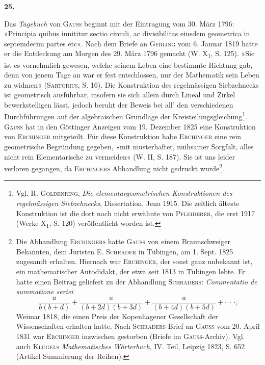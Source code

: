 \clearpage\begingroup{}
\renewcommand{\thefootnote}{\arabic{footnote})}\setcounter{footnote}{2}
\begin{center}
\textbf{25.}\par\smallskip
{}
\end{center}
\noindent\hspace*{\parindent}Das \textit{Tagebuch} von \textsc{Gauss} beginnt mit der Eintragung vom 30. März 1796:
»Principia quibus innititur sectio circuli, ac divisibilitas eiusdem geometrica
in septemdecim partes etc«. Nach dem Briefe an \textsc{Gerling} vom 6. Januar 1819
hatte er die Entdeckung am Morgen des 29. März 1796 gemacht (W. X\textsubscript{1},
S. 125). »Sie ist es vornehmlich gewesen, welche seinem Leben eine bestimmte
Richtung gab, denn von jenem Tage an war er fest entschlossen,
nur der Mathematik sein Leben zu widmen« (\textsc{Sartorius}, S. 16). Die Konstruktion
des regelmässigen Siebzehnecks ist geometrisch ausführbar, insofern
sie sich allein durch Lineal und Zirkel bewerkstelligen lässt, jedoch beruht
der Beweis bei all’ den verschiedenen Durchführungen auf der algebraischen
Grundlage der Kreisteilungsgleichung\footnote{Vgl. R. \textsc{Goldenring}, \textit{Die elementargeometrischen Konstruktionen des regelmässigen Siebzehnecks}, Dissertation, Jena 1915. Die zeitlich älteste Konstruktion ist die dort noch nicht erwähnte von \textsc{Pfleiderer}, die erst 1917 (Werke X\textsubscript{1}, S. 120) veröffentlicht worden ist.}. \textsc{Gauss} hat in den Göttinger Anzeigen
vom 19. Dezember 1825 eine Konstruktion von \textsc{Erchinger} mitgeteilt. Für
diese Konstruktion habe \textsc{Erchinger} eine rein geometrische Begründung gegeben,
»mit musterhafter, mühsamer Sorgfalt, alles nicht rein Elementarische
zu vermeiden« (W. II, S. 187). Sie ist uns leider verloren gegangen, da \textsc{Erchingers}
Abhandlung nicht gedruckt wurde\footnote{Die Abhandlung \textsc{Erchingers} hatte \textsc{Gauss} von einem Braunschweiger Bekannten, dem Juristen
E. \textsc{Schrader} in Tübingen, am 1. Sept. 1825 zugesandt erhalten. Hiernach war \textsc{Erchinger}, der sonst ganz
unbekannt ist, ein mathematischer Autodidakt, der etwa seit 1813 in Tübingen lebte. Er hatte einen Beitrag
geliefert zu der Abhandlung \textsc{Schraders}: \textit{Commentatio de summatione seriei}
\[
\frac{a}{b(b+d)}+\frac{a}{(b+2d)(b+3d)}+\frac{a}{(b+4d)(b+5d)}+\cdotp\,\cdotp\,\cdotp,
\]
Weimar 1818, die einen Preis der Kopenhagener Gesellschaft der Wissenschaften erhalten hatte. Nach
\textsc{Schraders} Brief an \textsc{Gauss} vom 20. April 1831 war \textsc{Erchinger} inzwischen gestorben (Briefe im \textsc{Gauss}-Archiv).
Vgl. auch \textsc{Klügels} \textit{Mathematisches Wörterbuch}, IV. Teil, Leipzig 1823, S. 652 (Artikel Summierung
der Reihen).}.
